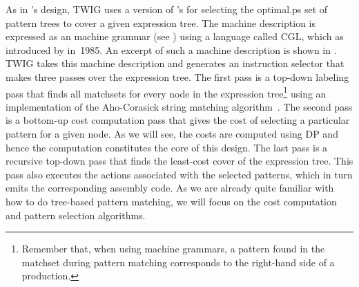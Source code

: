 {As in \citeauthor{Ripken1977}'s design, \gls{TWIG} uses a version of
\citeauthor{Aho1976a}'s \tDPalgorithm for selecting the \gls{optimal.ps}
set of \glspl{pattern tree} to cover a given \gls{expression tree}.
%
The
\gls{machine description} is expressed as an \gls{machine grammar} (see
) using a language called \gls{CGL}, which as
introduced by \textcite{Aho1985} in~1985.
%
An excerpt of such a \gls{machine
  description} is shown in .
%
\Gls{TWIG} takes this
\gls{machine description} and generates an \gls{instruction selector} that makes
three passes over the \gls{expression tree}.
%
The first pass is a top-down labeling
pass that finds all \glspl{matchset} for every \gls{node} in the \gls{expression tree}\footnote{Remember that, when using \glspl{machine grammar}, a
  \gls{pattern} found in the \gls{matchset} during \gls{pattern matching}
  corresponds to the right-hand side of a \gls{production}.} using an
implementation of the Aho-Corasick string matching algorithm~\cite{Aho1975}.
%
The
second pass is a bottom-up cost computation pass that gives the cost of
selecting a particular \gls{pattern} for a given \gls{node}.
%
As we will see, the
costs are computed using \gls{DP} and hence the computation constitutes the core
of this design.
%
The last pass is a recursive top-down pass that finds the
least-cost cover of the \gls{expression tree}.
%
This pass also executes the
\glspl{action} associated with the selected \glspl{pattern}, which in turn emits
the corresponding \gls{assembly code}.
%
 As we are already quite familiar with
how to do \gls{tree}-based \gls{pattern matching}, we will focus on the cost
computation and \gls{pattern selection} algorithms.

}
